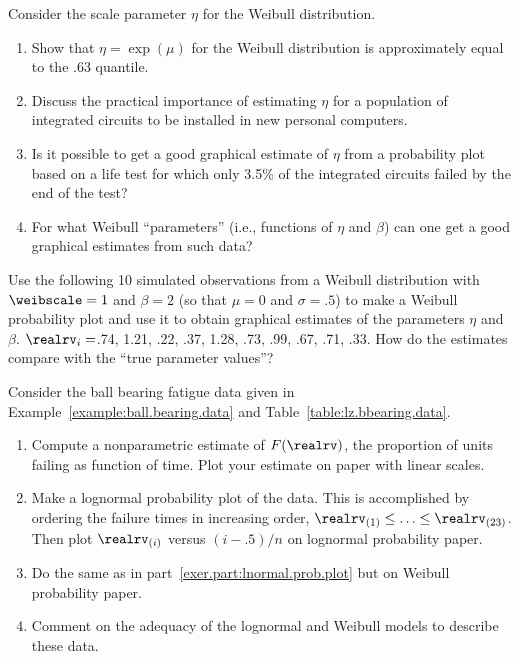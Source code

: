 \begin{exercise}
Consider the scale  parameter $\eta$ for the Weibull distribution.
\begin{enumerate}
\item
Show that $\eta=\exp(\mu)$ for the Weibull distribution is
approximately equal to the $.63$ quantile.
\item
Discuss the practical importance of estimating $\eta$ for a
population of integrated circuits to be installed in new personal
computers.
\item
Is it possible to get a good graphical estimate of $\eta$ from a
probability plot based on a life test for which only 3.5\% of the
integrated circuits failed by the end of the test?
\item
For what Weibull ``parameters'' (i.e., functions of $\eta$ and $\beta$)
can one get a good graphical estimates
from such data?
\end{enumerate}
\end{exercise}

\begin{exercise}
Use the following 10 simulated observations from a Weibull
distribution with $\weibscale=1$ and $\beta=2$ (so that $\mu=0$ and
$\sigma=.5$) to make a Weibull probability plot and use it to
obtain graphical estimates of the parameters
$\eta$ and $\beta$. 
$\realrv_{i}=$.74, 1.21, .22, .37, 1.28,
.73, .99, .67, .71, .33.
How do the estimates compare with the ``true parameter values''?
\end{exercise}


\begin{exercise} 
\label{exercise:bbear.nonpar.probplot}
Consider the ball bearing fatigue data
given in Example~\ref{example:ball.bearing.data}
and Table~\ref{table:lz.bbearing.data}.

\begin{enumerate}
\item
Compute a nonparametric estimate of $F(\realrv)$, the proportion of
units failing as function of time. Plot your estimate on paper with
linear scales.
\item
\label{exer.part:lnormal.prob.plot}
Make a lognormal probability plot of the data. This is accomplished
by ordering the failure times
 in increasing order, $\realrv_{(1)} \le \ldots \le \realrv_{(23)}$. 
Then plot
$\realrv_{(i)}$ versus $(i-.5)/n$ on lognormal 
probability paper.
\item
\label{exer.part:weibull.prob.plot}
Do the same as in part~\ref{exer.part:lnormal.prob.plot} but on
Weibull probability paper. 
\item
Comment on the adequacy
of the lognormal and Weibull models to describe these data.
\end{enumerate}
\end{exercise}


